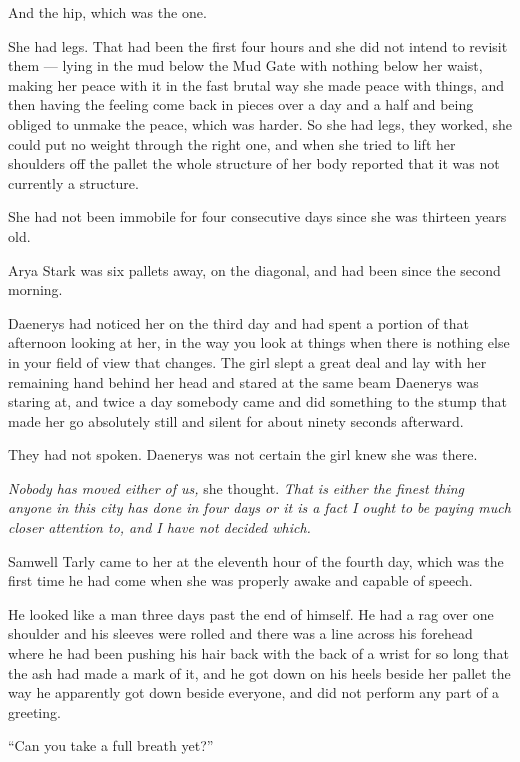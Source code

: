 And the hip, which was the one.

She had legs. That had been the first four hours and she did not intend to revisit them — lying in the mud below the Mud Gate with nothing below her waist, making her peace with it in the fast brutal way she made peace with things, and then having the feeling come back in pieces over a day and a half and being obliged to unmake the peace, which was harder. So she had legs, they worked, she could put no weight through the right one, and when she tried to lift her shoulders off the pallet the whole structure of her body reported that it was not currently a structure.

She had not been immobile for four consecutive days since she was thirteen years old.

\sceneBreak

Arya Stark was six pallets away, on the diagonal, and had been since the second morning.

Daenerys had noticed her on the third day and had spent a portion of that afternoon looking at her, in the way you look at things when there is nothing else in your field of view that changes. The girl slept a great deal and lay with her remaining hand behind her head and stared at the same beam Daenerys was staring at, and twice a day somebody came and did something to the stump that made her go absolutely still and silent for about ninety seconds afterward.

They had not spoken. Daenerys was not certain the girl knew she was there.

\textit{Nobody has moved either of us,} she thought. \textit{That is either the finest thing anyone in this city has done in four days or it is a fact I ought to be paying much closer attention to, and I have not decided which.}

\sceneBreak

Samwell Tarly came to her at the eleventh hour of the fourth day, which was the first time he had come when she was properly awake and capable of speech.

He looked like a man three days past the end of himself. He had a rag over one shoulder and his sleeves were rolled and there was a line across his forehead where he had been pushing his hair back with the back of a wrist for so long that the ash had made a mark of it, and he got down on his heels beside her pallet the way he apparently got down beside everyone, and did not perform any part of a greeting.

“Can you take a full breath yet?”

